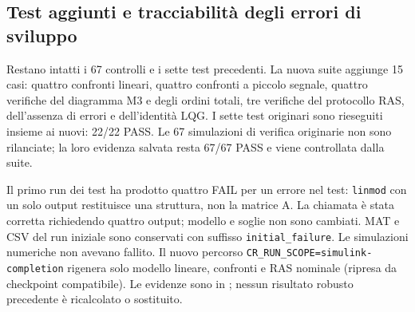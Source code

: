 \subsection{Test aggiunti e tracciabilità degli errori di sviluppo}
Restano intatti i 67 controlli e i sette test precedenti. La nuova suite
aggiunge 15 casi: quattro confronti lineari, quattro confronti a piccolo
segnale, quattro verifiche del diagramma M3 e degli ordini totali, tre
verifiche del protocollo RAS, dell'assenza di errori e dell'identità LQG.
I sette test originari sono rieseguiti insieme ai nuovi: 22/22 PASS.
Le 67 simulazioni di verifica originarie non sono rilanciate;
la loro evidenza salvata resta 67/67 PASS e viene controllata dalla suite.

Il primo run dei test ha prodotto quattro FAIL per un errore nel test:
\texttt{linmod} con un solo output restituisce una struttura, non la matrice A.
La chiamata è stata corretta richiedendo quattro output; modello e soglie
non sono cambiati. MAT e CSV del run iniziale sono conservati con suffisso
\texttt{initial\_failure}. Le simulazioni numeriche non avevano fallito.
Il nuovo percorso \texttt{CR\_RUN\_SCOPE=simulink-completion} rigenera solo
modello lineare, confronti e RAS nominale (ripresa da checkpoint compatibile).
Le evidenze sono in ; nessun risultato
robusto precedente è ricalcolato o sostituito.
